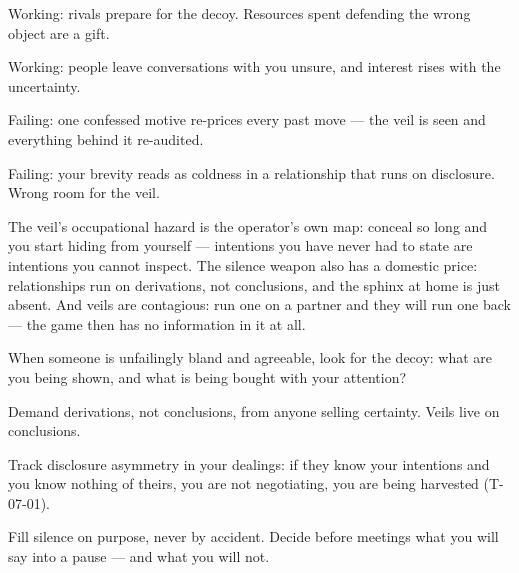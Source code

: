 \begin{feedback}
  \item Working: rivals prepare for the decoy. Resources spent defending the wrong object are a gift.
  \item Working: people leave conversations with you unsure, and interest rises with the uncertainty.
  \item Failing: one confessed motive re-prices every past move --- the veil is seen and everything behind it re-audited.
  \item Failing: your brevity reads as coldness in a relationship that runs on disclosure. Wrong room for the veil.
\end{feedback}
\begin{failure}
The veil's occupational hazard is the operator's own map: conceal so long and you start hiding from yourself --- intentions you have never had to state are intentions you cannot inspect. The silence weapon also has a domestic price: relationships run on derivations, not conclusions, and the sphinx at home is just absent. And veils are contagious: run one on a partner and they will run one back --- the game then has no information in it at all.
\end{failure}
\begin{countermeasures}
  \item When someone is unfailingly bland and agreeable, look for the decoy: what are you being shown, and what is being bought with your attention?
  \item Demand derivations, not conclusions, from anyone selling certainty. Veils live on conclusions.
  \item Track disclosure asymmetry in your dealings: if they know your intentions and you know nothing of theirs, you are not negotiating, you are being harvested (T-07-01).
  \item Fill silence on purpose, never by accident. Decide before meetings what you will say into a pause --- and what you will not.
\end{countermeasures}

\seesources
{}
